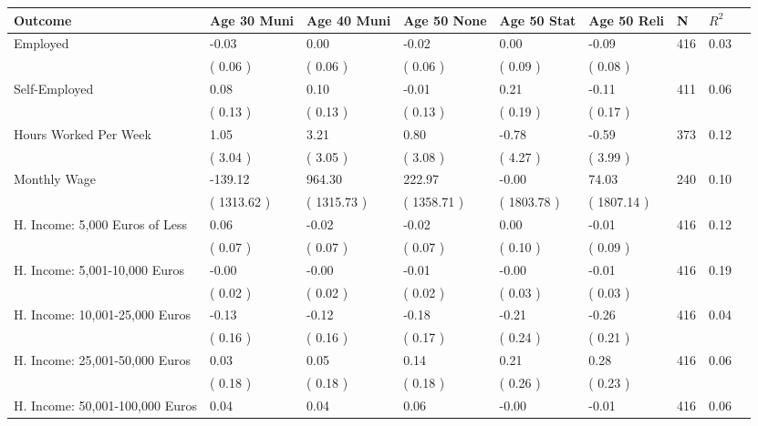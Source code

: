 \begin{tabular}{L{6.2cm} C{1.8cm} C{1.8cm} C{1.8cm} C{1.8cm} C{1.8cm} C{1.8cm} C{0.3cm} C{0.3cm}}
\toprule
 \textbf{Outcome} & \textbf{Age 30 Muni} & \textbf{Age 40 Muni} & \textbf{Age 50 None} & \textbf{Age 50 Stat} & \textbf{Age 50 Reli} & \textbf{N} & \textbf{$ R^2$} \\
\midrule
Employed &     -0.03 &      0.00 &     -0.02 &      0.00 &     -0.09  & 416 &       0.03 \\ 
 & (     0.06 ) & (     0.06 ) & (     0.06 ) & (     0.09 ) & (     0.08 )  & \\
Self-Employed &      0.08 &      0.10 &     -0.01 &      0.21 &     -0.11  & 411 &       0.06 \\ 
 & (     0.13 ) & (     0.13 ) & (     0.13 ) & (     0.19 ) & (     0.17 )  & \\
Hours Worked Per Week &      1.05 &      3.21 &      0.80 &     -0.78 &     -0.59  & 373 &       0.12 \\ 
 & (     3.04 ) & (     3.05 ) & (     3.08 ) & (     4.27 ) & (     3.99 )  & \\
Monthly Wage &   -139.12 &    964.30 &    222.97 &     -0.00 &     74.03  & 240 &       0.10 \\ 
 & (  1313.62 ) & (  1315.73 ) & (  1358.71 ) & (  1803.78 ) & (  1807.14 )  & \\
H. Income: 5,000 Euros of Less &      0.06 &     -0.02 &     -0.02 &      0.00 &     -0.01  & 416 &       0.12 \\ 
 & (     0.07 ) & (     0.07 ) & (     0.07 ) & (     0.10 ) & (     0.09 )  & \\
H. Income: 5,001-10,000 Euros &     -0.00 &     -0.00 &     -0.01 &     -0.00 &     -0.01  & 416 &       0.19 \\ 
 & (     0.02 ) & (     0.02 ) & (     0.02 ) & (     0.03 ) & (     0.03 )  & \\
H. Income: 10,001-25,000 Euros &     -0.13 &     -0.12 &     -0.18 &     -0.21 &     -0.26  & 416 &       0.04 \\ 
 & (     0.16 ) & (     0.16 ) & (     0.17 ) & (     0.24 ) & (     0.21 )  & \\
H. Income: 25,001-50,000 Euros &      0.03 &      0.05 &      0.14 &      0.21 &      0.28  & 416 &       0.06 \\ 
 & (     0.18 ) & (     0.18 ) & (     0.18 ) & (     0.26 ) & (     0.23 )  & \\
H. Income: 50,001-100,000 Euros &      0.04 &      0.04 &      0.06 &     -0.00 &     -0.01  & 416 &       0.06 \\ 

\end{tabular}
